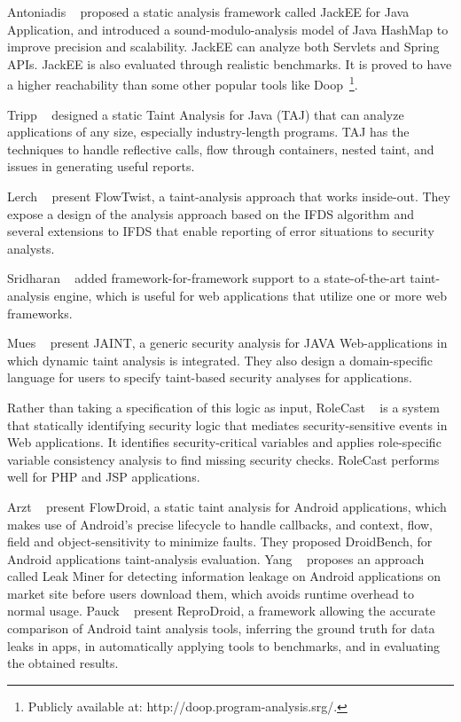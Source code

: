 Antoniadis \etal~\cite{Antoniadis+etal:2020:Java} proposed a static
analysis framework called JackEE for Java Application, and introduced a
sound-modulo-analysis model of Java HashMap to improve precision and
scalability. JackEE can analyze both Servlets and Spring APIs. JackEE is also
evaluated through realistic benchmarks. It is proved to have a higher
reachability than some other popular tools like Doop~\footnote{Publicly
  available at: http://doop.program-analysis.srg/.}.
  
Tripp \etal~\cite{10.1145/1542476.1542486} designed a static Taint Analysis for Java (TAJ) that can analyze applications of any size, especially industry-length programs. TAJ has the techniques to handle reflective calls, flow through containers, nested taint, and issues in generating useful reports.

Lerch \etal~\cite{10.1145/2635868.2635878} present FlowTwist, a taint-analysis approach that works inside-out. They expose a design of the analysis approach based on the IFDS algorithm and several extensions to IFDS that enable reporting of error situations to security analysts.

Sridharan \etal~\cite{10.1145/2076021.2048145} added framework-for-framework support to a state-of-the-art taint-analysis engine, which is useful for web applications that utilize one or more web frameworks.

Mues \etal~\cite{10.1007/978-3-030-63461-2_7} present JAINT, a generic security analysis for JAVA Web-applications in which dynamic taint analysis is integrated. They also design a domain-specific language for users to specify taint-based security analyses for applications.

Rather than taking a specification of this logic as input, RoleCast
\etal~\cite{10.1145/2048066.2048146} is a system that statically
identifying security logic that mediates security-sensitive events in Web
applications. It identifies security-critical variables and applies
role-specific variable consistency analysis to find missing security checks.
RoleCast performs well for PHP and JSP applications.

Arzt \etal~\cite{10.1145/2594291.2594299} present FlowDroid, a static taint analysis for Android applications, which makes use of Android's precise lifecycle to handle callbacks, and context, flow, field and object-sensitivity to minimize faults. They proposed DroidBench, for Android applications taint-analysis evaluation. Yang \etal~\cite{6394931} proposes an approach called Leak Miner for detecting information leakage on Android applications on market site before users download them, which avoids runtime overhead to normal usage. Pauck \etal~\cite{10.1145/3236024.3236029} present ReproDroid, a framework allowing the accurate comparison of Android taint analysis tools, inferring the ground truth for data leaks in apps, in automatically applying tools to benchmarks, and in evaluating the obtained results.

